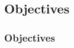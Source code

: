 \subsection*{Objectives}
\begin{frame}[t]
    \frametitle{Objectives}
    \cite{mythos_interp}
\end{frame}